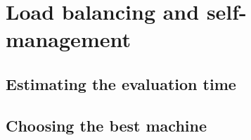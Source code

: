 \chapter{Load balancing and self-management}
\label{chapter:virt-load}


\section{Estimating the evaluation time}
\label{sec:vmc-estimating}

\section{Choosing the best machine}
\label{sec:vmc-best}





